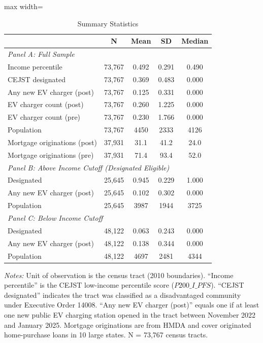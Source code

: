 \begin{table}[H]
\centering
\caption{Summary Statistics}
\begin{threeparttable}
\begin{adjustbox}{max width=\textwidth}
\begin{tabular}{lcccc}
\toprule
 & N & Mean & SD & Median \\
\midrule
\multicolumn{5}{l}{\textit{Panel A: Full Sample}} \\[3pt]
Income percentile & 73,767 & 0.492 & 0.291 & 0.490 \\
CEJST designated & 73,767 & 0.369 & 0.483 & 0.000 \\
Any new EV charger (post) & 73,767 & 0.125 & 0.331 & 0.000 \\
EV charger count (post) & 73,767 & 0.260 & 1.225 & 0.000 \\
EV charger count (pre) & 73,767 & 0.230 & 1.766 & 0.000 \\
Population & 73,767 & 4450 & 2333 & 4126 \\
Mortgage originations (post) & 37,931 & 31.1 & 41.2 & 24.0 \\
Mortgage originations (pre) & 37,931 & 71.4 & 93.4 & 52.0 \\
\midrule
\multicolumn{5}{l}{\textit{Panel B: Above Income Cutoff (Designated Eligible)}} \\[3pt]
Designated & 25,645 & 0.945 & 0.229 & 1.000 \\
Any new EV charger (post) & 25,645 & 0.102 & 0.302 & 0.000 \\
Population & 25,645 & 3987 & 1944 & 3725 \\
\midrule
\multicolumn{5}{l}{\textit{Panel C: Below Income Cutoff}} \\[3pt]
Designated & 48,122 & 0.063 & 0.243 & 0.000 \\
Any new EV charger (post) & 48,122 & 0.138 & 0.344 & 0.000 \\
Population & 48,122 & 4697 & 2481 & 4344 \\
\bottomrule
\end{tabular}
\end{adjustbox}
\begin{tablenotes}[flushleft]
\small
\item \textit{Notes:} Unit of observation is the census tract (2010 boundaries). ``Income percentile'' is the CEJST low-income percentile score ($P200\_I\_PFS$). ``CEJST designated'' indicates the tract was classified as a disadvantaged community under Executive Order 14008. ``Any new EV charger (post)'' equals one if at least one new public EV charging station opened in the tract between November 2022 and January 2025. Mortgage originations are from HMDA and cover originated home-purchase loans in 10 large states. N = 73,767 census tracts.
\end{tablenotes}
\end{threeparttable}
\label{tab:summary}
\end{table}

